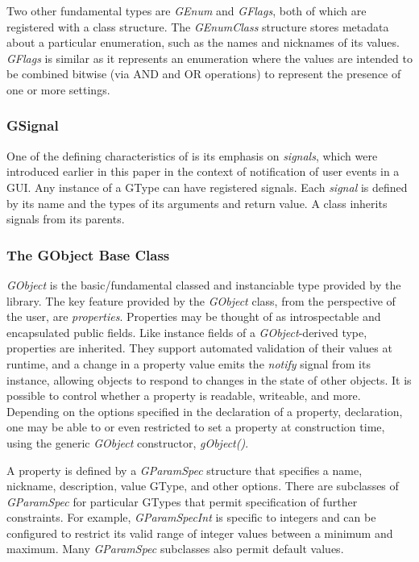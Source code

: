 \documentclass[article]{jss}
\begin{document}
Two other fundamental types are
\emph{GEnum} and \emph{GFlags}, both of which are registered with a class structure. The \emph{GEnumClass} structure stores metadata about a particular enumeration, such as the names and nicknames of its
values.  \emph{GFlags} is similar as it represents an enumeration
where the values are intended to be combined bitwise (via AND and OR
operations) to represent the presence of one or more settings.

\subsubsection{GSignal}

One of the defining characteristics of  is its emphasis
on \emph{signals}, which were introduced earlier in this paper in the
context of notification of user events in a  GUI. Any
instance of a GType can have registered signals. Each \emph{signal} is
defined by its name and the types of its arguments and return value. A
class inherits signals from its parents.

\subsubsection{The GObject Base Class}

\emph{GObject} is the basic/fundamental classed and instanciable type
provided by the  library.  The key feature provided by
the \emph{GObject} class, from the perspective of the 
user, are \emph{properties}. Properties may be thought of as
introspectable and encapsulated public fields. Like instance fields of a \emph{GObject}-derived type,
properties
are inherited. They support automated validation of their values at
runtime, and a change in a property value emits the \emph{notify}
signal from its instance, allowing objects to respond to changes in
the state of other objects. It is possible to control whether a
property is readable, writeable, and more. Depending on the options specified in the declaration of a property,
declaration,
one may be able to or even restricted to set a property at
construction time, using the generic \emph{GObject} constructor,
\emph{gObject()}.

A property is defined by a \emph{GParamSpec} structure that specifies
a name, 
nickname, description, value GType, and other options. There are
subclasses of 
\emph{GParamSpec} for particular GTypes that permit specification of
further 
constraints. For example, \emph{GParamSpecInt} is specific to integers
and can be
configured to restrict its valid range of integer values between a
minimum and maximum.
Many \emph{GParamSpec} subclasses also permit default values.
\end{document}
